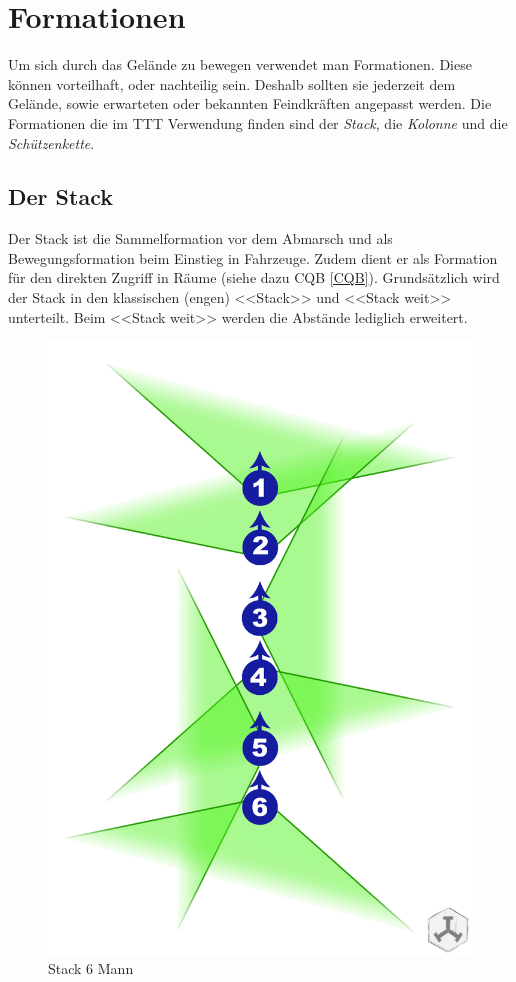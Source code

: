 \section{Formationen}
Um sich durch das Gelände zu bewegen verwendet man Formationen. Diese können vorteilhaft, oder nachteilig sein. Deshalb sollten sie jederzeit dem Gelände, sowie erwarteten oder bekannten Feindkräften angepasst werden. Die Formationen die im TTT Verwendung finden sind der \textit{Stack}, die \textit{Kolonne} und die \textit{Schützenkette}. 

\subsection{Der Stack}
Der Stack ist die Sammelformation vor dem Abmarsch und als Bewegungsformation beim Einstieg in Fahrzeuge. Zudem dient er als Formation für den direkten Zugriff in Räume (siehe dazu CQB \autoref{CQB}). Grundsätzlich wird der Stack in den klassischen (engen) <<Stack>> und <<Stack weit>> unterteilt. Beim <<Stack weit>> werden die Abstände lediglich erweitert.
\begin{figure}[!htb]
	\centering
	\includegraphics[width=0.5\linewidth]{./img/grundlagen/formationen/stack_6mann.jpg}
	\caption{Stack 6 Mann}
\end{figure}\\

